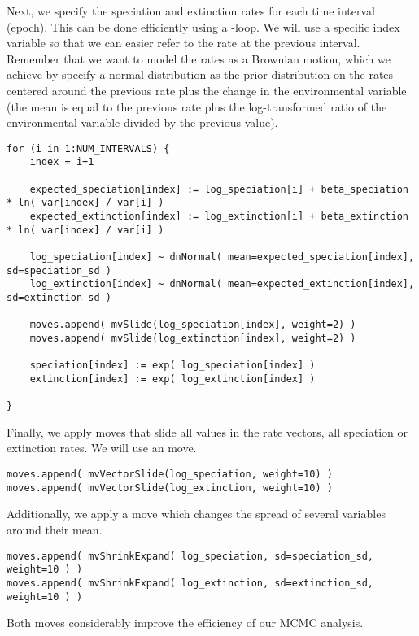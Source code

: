 Next, we specify the speciation and extinction rates for each time interval (\IE epoch).
This can be done efficiently using a -loop.
We will use a specific index variable so that we can easier refer to the rate at the previous interval.
Remember that we want to model the rates as a Brownian motion, which we achieve by specify a normal distribution as the prior distribution on the rates centered around the previous rate plus the change in the environmental variable (\IE the mean is equal to the previous rate plus the log-transformed ratio of the environmental variable divided by the previous value).
{\tt \begin{snugshade*}
\begin{lstlisting}
for (i in 1:NUM_INTERVALS) {
    index = i+1
    
    expected_speciation[index] := log_speciation[i] + beta_speciation * ln( var[index] / var[i] )
    expected_extinction[index] := log_extinction[i] + beta_extinction * ln( var[index] / var[i] )
    
    log_speciation[index] ~ dnNormal( mean=expected_speciation[index], sd=speciation_sd )
    log_extinction[index] ~ dnNormal( mean=expected_extinction[index], sd=extinction_sd )

    moves.append( mvSlide(log_speciation[index], weight=2) )
    moves.append( mvSlide(log_extinction[index], weight=2) )

    speciation[index] := exp( log_speciation[index] )
    extinction[index] := exp( log_extinction[index] )

}
\end{lstlisting}
\end{snugshade*}}
Finally, we apply moves that slide all values in the rate vectors, \IE all speciation or extinction rates. 
We will use an  move.
{\tt \begin{snugshade*}
\begin{lstlisting}
moves.append( mvVectorSlide(log_speciation, weight=10) )
moves.append( mvVectorSlide(log_extinction, weight=10) )
\end{lstlisting}
\end{snugshade*}}

Additionally, we apply a  move which changes the spread of several variables around their mean.
{\tt \begin{snugshade*}
\begin{lstlisting}
moves.append( mvShrinkExpand( log_speciation, sd=speciation_sd, weight=10 ) )
moves.append( mvShrinkExpand( log_extinction, sd=extinction_sd, weight=10 ) )
\end{lstlisting}
\end{snugshade*}}
Both moves considerably improve the efficiency of our MCMC analysis.


